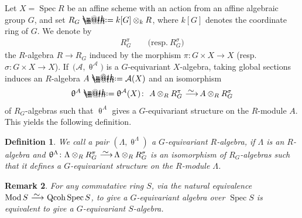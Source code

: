 \documentclass[pdftex]{sigma}%
\makeatletter
\newtheorem{dfn}{Definition}[section]
\newtheorem{rem}[dfn]{Remark}
\newcommand*{\defeq}{\mathrel{\rlap{%
 \raisebox{0.3ex}{$\m@th\cdot$}}%
 \raisebox{-0.3ex}{$\m@th\cdot$}}%
 =}
\numberwithin{equation}{section}
\newcommand{\Spec}{\operatorname{Spec}}
\newcommand{\Qcoh}{\operatorname{Qcoh}}
\newcommand{\Mod}{\operatorname{Mod}}
\newcommand{\cA}{\mathcal{A}}
\newcommand{\simto}{\,\,\,\,\raisebox{4pt}{$\sim$}{\kern -1.1em \longrightarrow}\,}
\makeatother
\begin{document}
Let $X=\Spec R$ be an affine scheme with an action from an affine algebraic group $G$, and set $R_G\defeq k[G]\otimes_kR$, where $k[G]$ denotes the coordinate ring of $G$. We denote by
\begin{gather*}
R_G^{\pi}\qquad \big(\text{resp.}~R_G^{\sigma}\big)
\end{gather*}
the $R$-algebra $R\to R_G$ induced by the morphism $\pi\colon G\times X\to X$ (resp.\ $\sigma\colon G\times X\to X$).
If~$\big(\cA,\uptheta^{\cA}\big)$ is a $G$-equivariant $X$-algebra, taking global sections induces an $R$-algebra $A\defeq\cA(X)$ and an isomorphism
\begin{gather*}
\uptheta^{A}\defeq\uptheta^{\cA}(X)\colon\ A\otimes_R R_G^{\pi}\simto A\otimes_RR_G^{\sigma}
\end{gather*}
of $R_G$-algebras such that $\uptheta^{A}$ gives a $G$-equivariant structure on the $R$-module $A$. This yields the following definition.


 \begin{dfn}
 We call a pair
 $(\Lambda,\uptheta^{\Lambda})$
 a {\it $G$-equivariant $R$-algebra}, if $\Lambda$ is an $R$-algebra and $\uptheta^{\Lambda}\colon \Lambda\otimes_RR_G^{\pi}\simto\Lambda\otimes_RR_G^{\sigma}$ is an isomorphism of $R_G$-algebras such that it defines a $G$-equivariant structure on the $R$-module $\Lambda$.
 \end{dfn}

 \begin{rem}
For any commutative ring $S$, via the natural equivalence $\Mod S\simto \Qcoh \Spec S$, to give a $G$-equivariant algebra over $\Spec S$ is equivalent to give a $G$-equivariant $S$-algebra.
 \end{rem}
\end{document}
